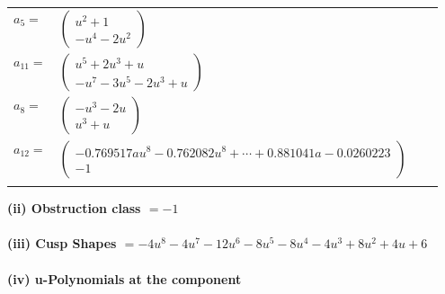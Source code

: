 \documentclass[1p]{elsarticle_modified}
\theoremstyle{definition}
\begin{document}
\begin{tabular}{m{7pt} m{180pt} m{7pt} m{180pt} }
\flushright $a_{5}=$&$\begin{pmatrix}u^2+1\\- u^4-2 u^2\end{pmatrix}$ \\
\flushright $a_{11}=$&$\begin{pmatrix}u^5+2 u^3+u\\- u^7-3 u^5-2 u^3+u\end{pmatrix}$ \\
\flushright $a_{8}=$&$\begin{pmatrix}- u^3-2 u\\u^3+u\end{pmatrix}$ \\
\flushright $a_{12}=$&$\begin{pmatrix}-0.769517 a u^{8}-0.762082 u^{8}+\cdots+0.881041 a-0.0260223\\-1\end{pmatrix}$\\&\end{tabular}
\flushleft \textbf{(ii) Obstruction class $= -1$}\\~\\
\flushleft \textbf{(iii) Cusp Shapes $= -4 u^8-4 u^7-12 u^6-8 u^5-8 u^4-4 u^3+8 u^2+4 u+6$}\\~\\
\newpage\renewcommand{\arraystretch}{1}
\flushleft \textbf{(iv) u-Polynomials at the component}\newline \\
\end{document}
